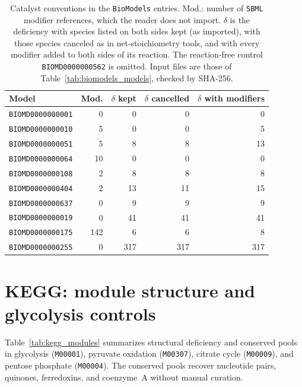 \documentclass[10pt,a4paper,fleqn]{article}
\theoremstyle{plain}\newtheorem{theorem}{Theorem}
\begin{document}
\begin{table}[htbp]
\centering
\caption{Catalyst conventions in the \texttt{BioModels} entries. Mod.: number of \texttt{SBML} modifier references, which the reader does not import. $\delta$ is the deficiency with species listed on both sides kept (as imported), with those species canceled as in net-stoichiometry tools, and with every modifier added to both sides of its reaction. The reaction-free control \texttt{BIOMD0000000562} is omitted. Input files are those of Table~\ref{tab:biomodels_models}, checked by SHA-256.}
\label{tab:biomodels_modifiers}
\small
\begin{tabular*}{\linewidth}{@{\extracolsep{\fill}}lrrrr@{}}
\toprule
Model & Mod. & $\delta$ kept & $\delta$ cancelled & $\delta$ with modifiers \\
\midrule
\texttt{BIOMD0000000001} & 0 & 0 & 0 & 0 \\
\texttt{BIOMD0000000010} & 5 & 0 & 0 & 5 \\
\texttt{BIOMD0000000051} & 5 & 8 & 8 & 13 \\
\texttt{BIOMD0000000064} & 10 & 0 & 0 & 0 \\
\texttt{BIOMD0000000108} & 2 & 8 & 8 & 8 \\
\texttt{BIOMD0000000404} & 2 & 13 & 11 & 15 \\
\texttt{BIOMD0000000637} & 0 & 9 & 9 & 9 \\
\texttt{BIOMD0000000019} & 0 & 41 & 41 & 41 \\
\texttt{BIOMD0000000175} & 142 & 6 & 6 & 8 \\
\texttt{BIOMD0000000255} & 0 & 317 & 317 & 317 \\
\bottomrule
\end{tabular*}
\end{table}

\section{KEGG: module structure and glycolysis controls}
\label{si:kegg}
\label{sec:si_case_glycolysis}

Table~\ref{tab:kegg_modules} summarizes structural deficiency and conserved pools in glycolysis (\texttt{M00001}), pyruvate oxidation (\texttt{M00307}), citrate cycle (\texttt{M00009}), and pentose phosphate (\texttt{M00004}). The conserved pools recover nucleotide pairs, quinones, ferredoxins, and coenzyme~A without manual curation.
\end{document}
